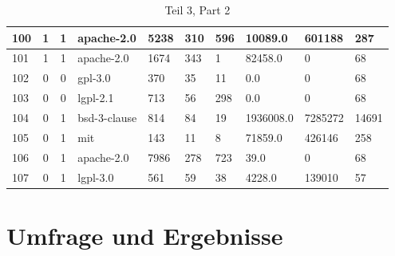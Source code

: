 \begin{landscape}
\begin{table}[]
{\begin{tabular}{lcclllllll}
                100 & 1                          & 1                     & apache-2.0       & 5238             & 310                   & 596                          & 10089.0         & 601188             & 287                 \\ \hline
                101 & 1                          & 1                     & apache-2.0       & 1674             & 343                   & 1                            & 82458.0         & 0                  & 68                  \\ \hline
                102 & 0                          & 0                     & gpl-3.0          & 370              & 35                    & 11                           & 0.0             & 0                  & 68                  \\ \hline
                103 & 0                          & 0                     & lgpl-2.1         & 713              & 56                    & 298                          & 0.0             & 0                  & 68                  \\ \hline
                104 & 0                          & 1                     & bsd-3-clause     & 814              & 84                    & 19                           & 1936008.0       & 7285272            & 14691               \\ \hline
                105 & 0                          & 1                     & mit              & 143              & 11                    & 8                            & 71859.0         & 426146             & 258                 \\ \hline
                106 & 0                          & 1                     & apache-2.0       & 7986             & 278                   & 723                          & 39.0            & 0                  & 68                  \\ \hline
                107 & 0                          & 1                     & lgpl-3.0         & 561              & 59                    & 38                           & 4228.0          & 139010             & 57
            \end{tabular}%
        }
        \caption*{Teil 3, Part 2}
    \end{table}
\end{landscape}


\section{Umfrage und Ergebnisse}


